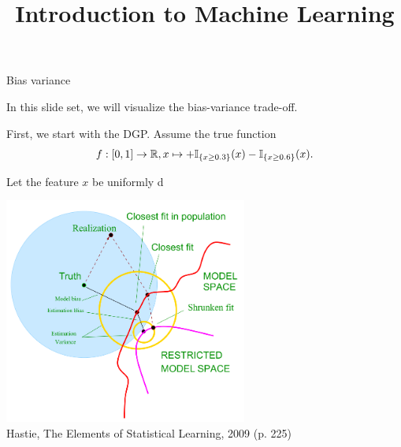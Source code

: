 \documentclass[11pt,compress,t,notes=noshow, xcolor=table]{beamer}
\title{Introduction to Machine Learning}
\date{}
\begin{document}


\begin{vbframe}{Bias variance}

In this slide set, we will visualize the bias-variance trade-off. \\
\lz 

First, we start with the DGP. Assume the true function $$f: [0, 1] \rightarrow \mathbb{R}, x\mapsto +\mathbb{I}_{\{x \geq 0.3\}}(x) - \mathbb{I}_{\{x \geq 0.6\}}(x).$$

Let the feature $x$ be uniformly d

\framebreak 

\center
\vspace*{0.5cm}
\includegraphics[width=0.6\textwidth]{figure_man/biasvariance_scheme.png} \\
\footnotesize{Hastie, The Elements of Statistical Learning, 2009 (p. 225)}


\end{vbframe}



\endlecture
\end{document}
